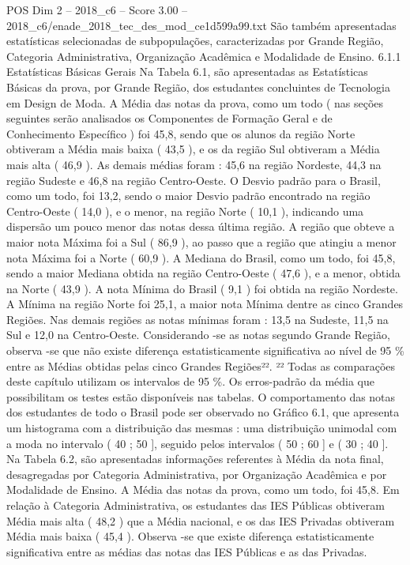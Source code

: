 \begin{textsample}{POS Dim 2 – 2018\_c6 – Score 3.00 – 2018\_c6/enade\_2018\_tec\_des\_mod\_ce1d599a99.txt}
São também apresentadas estatísticas selecionadas de subpopulações, caracterizadas por Grande Região, Categoria Administrativa, Organização Acadêmica e Modalidade de Ensino. 6.1.1 Estatísticas Básicas Gerais Na Tabela 6.1, são apresentadas as Estatísticas Básicas da prova, por Grande Região, dos estudantes concluintes de Tecnologia em Design de Moda.
A Média das notas da prova, como um todo ( nas seções seguintes serão analisados os Componentes de Formação Geral e de Conhecimento Específico ) foi 45,8, sendo que os alunos da região Norte obtiveram a Média mais baixa ( 43,5 ), e os da região Sul obtiveram a Média mais alta ( 46,9 ).
As demais médias foram : 45,6 na região Nordeste, 44,3 na região Sudeste e 46,8 na região Centro-Oeste.
O Desvio padrão para o Brasil, como um todo, foi 13,2, sendo o maior Desvio padrão encontrado na região Centro-Oeste ( 14,0 ), e o menor, na região Norte ( 10,1 ), indicando uma dispersão um pouco menor das notas dessa última região.
A região que obteve a maior nota Máxima foi a Sul ( 86,9 ), ao passo que a região que atingiu a menor nota Máxima foi a Norte ( 60,9 ).
A Mediana do Brasil, como um todo, foi 45,8, sendo a maior Mediana obtida na região Centro-Oeste ( 47,6 ), e a menor, obtida na Norte ( 43,9 ).
A nota Mínima do Brasil ( 9,1 ) foi obtida na região Nordeste.
A Mínima na região Norte foi 25,1, a maior nota Mínima dentre as cinco Grandes Regiões.
Nas demais regiões as notas mínimas foram : 13,5 na Sudeste, 11,5 na Sul e 12,0 na Centro-Oeste.
Considerando -se as notas segundo Grande Região, observa -se que não existe diferença estatisticamente significativa ao nível de 95 \% entre as Médias obtidas pelas cinco Grandes Regiões²². ²² Todas as comparações deste capítulo utilizam os intervalos de 95 \%.
Os erros-padrão da média que possibilitam os testes estão disponíveis nas tabelas.
O comportamento das notas dos estudantes de todo o Brasil pode ser observado no Gráfico 6.1, que apresenta um histograma com a distribuição das mesmas : uma distribuição unimodal com a moda no intervalo ( 40 ; 50 ], seguido pelos intervalos ( 50 ; 60 ] e ( 30 ; 40 ].
Na Tabela 6.2, são apresentadas informações referentes à Média da nota final, desagregadas por Categoria Administrativa, por Organização Acadêmica e por Modalidade de Ensino.
A Média das notas da prova, como um todo, foi 45,8.
Em relação à Categoria Administrativa, os estudantes das IES Públicas obtiveram Média mais alta ( 48,2 ) que a Média nacional, e os das IES Privadas obtiveram Média mais baixa ( 45,4 ).
Observa -se que existe diferença estatisticamente significativa entre as médias das notas das IES Públicas e as das Privadas.

\end{textsample}

